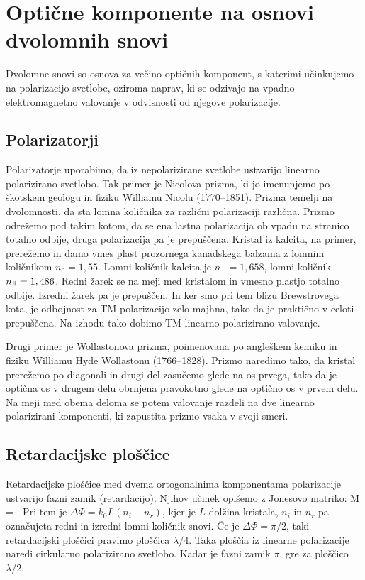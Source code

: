 \section{Optične komponente na osnovi dvolomnih snovi}
Dvolomne snovi so osnova za večino optičnih komponent, s katerimi učinkujemo na polarizacijo
svetlobe, oziroma naprav, ki se odzivajo na vpadno elektromagnetno valovanje v odvisnosti
od njegove polarizacije.

\subsection*{Polarizatorji}
Polarizatorje uporabimo, da iz nepolarizirane svetlobe ustvarijo  linearno polarizirano 
svetlobo. Tak primer je Nicolova prizma, ki jo imenunjemo po škotskem geologu in fiziku
Williamu Nicolu (1770--1851). Prizma temelji na dvolomnosti, da sta lomna količnika za 
različni polarizaciji različna. Prizmo odrežemo pod takim kotom, da se ena lastna polarizacija
ob vpadu na stranico totalno odbije, druga polarizacija pa je prepuščena. Kristal iz kalcita, 
na primer, prerežemo in damo vmes plast prozornega kanadskega balzama z lomnim
količnikom $n_0=1,55$.  Lomni količnik kalcita je $n_\perp = 1,658$, lomni količnik
$n_\myparallel = 1,486$. Redni žarek se na meji med kristalom in vmesno plastjo 
totalno odbije. Izredni žarek pa je prepuščen. In ker smo pri tem blizu Brewstrovega kota,
je odbojnost za TM polarizacijo zelo majhna, tako da je praktično v celoti prepuščena. Na izhodu
tako dobimo TM linearno polarizirano valovanje. 

Drugi primer je Wollastonova prizma, poimenovana po angleškem kemiku in fiziku 
Williamu Hyde Wollastonu (1766--1828). Prizmo naredimo tako, da kristal prerežemo po 
diagonali in drugi del zasučemo glede na os prvega, tako da je optična os v drugem delu
obrnjena pravokotno glede na optično os v prvem delu. Na meji med obema deloma se potem 
valovanje razdeli na dve linearno polarizirani komponenti, ki zapustita prizmo vsaka v svoji
smeri. 

\subsection*{Retardacijske ploščice}
Retardacijske ploščice med dvema ortogonalnima komponentama polarizacije ustvarijo
fazni zamik (retardacijo). Njihov učinek opišemo z Jonesovo matriko:
\beq
M = 
\!\!.
\eeq
Pri tem je $\Delta \Phi = k_0 L (n_i-n_r)$, kjer je $L$ dolžina kristala, $n_i$ in $n_r$
pa označujeta redni in izredni lomni količnik snovi. Če je $\Delta \Phi= \pi/2$, taki 
retardacijski ploščici pravimo ploščica $\lambda/4$. Taka ploščia iz linearne polarizacije
naredi cirkularno polarizirano svetlobo. Kadar je fazni zamik $\pi$, gre za ploščico $\lambda/2$.

